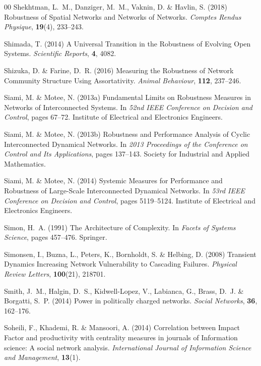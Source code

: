 \documentclass{comnet-mod}
\begin{document}
\begin{thebibliography}{00}
Shekhtman, L.~M., Danziger, M.~M., Vaknin, D. {\&} Havlin, S. (2018)
  {Robustness of Spatial Networks and Networks of Networks}. {\em {Comptes
  Rendus Physique}}, \textbf{19}(4), 233--243.

Shimada, T. (2014)  {A Universal Transition in the Robustness of Evolving Open
  Systems}. {\em {Scientific Reports}}, \textbf{4}, 4082.

Shizuka, D. {\&} Farine, D.~R. (2016)  {Measuring the Robustness of Network
  Community Structure Using Assortativity}. {\em {Animal Behaviour}},
  \textbf{112}, 237--246.

Siami, M. {\&} Motee, N. (2013a)  {Fundamental Limits on Robustness Measures in
  Networks of Interconnected Systems}. In {\em {52nd {{IEEE}} Conference on
  Decision and Control}}, pages 67--72. {Institute of Electrical and
  Electronics Engineers}.

Siami, M. {\&} Motee, N. (2013b)  {Robustness and Performance Analysis of
  Cyclic Interconnected Dynamical Networks}. In {\em {2013 {{Proceedings}} of
  the {{Conference}} on {{Control}} and Its {{Applications}}}}, pages 137--143.
  {Society for Industrial and Applied Mathematics}.

Siami, M. {\&} Motee, N. (2014)  {Systemic Measures for Performance and
  Robustness of Large-Scale Interconnected Dynamical Networks}. In {\em {53rd
  {{IEEE}} Conference on Decision and Control}}, pages 5119--5124. {Institute
  of Electrical and Electronics Engineers}.

Simon, H.~A. (1991)  {The Architecture of Complexity}. In {\em {Facets of
  Systems Science}}, pages 457--476. {Springer}.

Simonsen, I., Buzna, L., Peters, K., Bornholdt, S. {\&} Helbing, D. (2008)
  {Transient Dynamics Increasing Network Vulnerability to Cascading Failures}.
  {\em {Physical Review Letters}}, \textbf{100}(21), 218701.

Smith, J.~M., Halgin, D.~S., Kidwell-Lopez, V., Labianca, G., Brass, D.~J. {\&}
  Borgatti, S.~P. (2014)  Power in politically charged networks. {\em {Social
  Networks}}, \textbf{36}, 162--176.

Soheili, F., Khademi, R. {\&} Mansoori, A. (2014)  {Correlation between Impact
  Factor and productivity with centrality measures in journals of Information
  science: A social network analysis}. {\em {International Journal of
  Information Science and Management}}, \textbf{13}(1).


\end{thebibliography}
\end{document}
